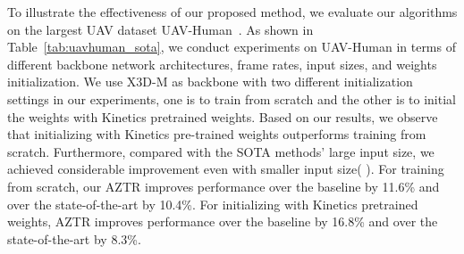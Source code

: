 \documentclass[letterpaper, 10 pt, conference]{ieeeconf}
\begin{document}
\begin{table}
\caption{Benchmarking UAV Human and comparisons with prior arts. We compared with the state-of-the-art methods, which demonstrates an improvement of  over SOTA methods. Trained on high-end desktop GPUs.}
\vspace{-5pt}
\label{tab:uavhuman_sota}
\end{table} To illustrate the effectiveness of our proposed method, we evaluate our algorithms on the largest UAV dataset UAV-Human~\cite{li2021uav}. As shown in Table~\ref{tab:uavhuman_sota}, we conduct experiments on UAV-Human in terms of different backbone network architectures, frame rates, input sizes, and weights initialization. We use X3D-M as backbone with two different initialization settings in our experiments, one is to train from scratch and the other is to initial the weights with Kinetics pretrained weights. Based on our results, we observe that initializing with Kinetics pre-trained weights outperforms training from scratch. Furthermore, compared with the SOTA methods' large input size, we achieved considerable improvement even with smaller input size( ). For training from scratch, our AZTR improves performance over the baseline by 11.6\% and over the state-of-the-art by 10.4\%. For initializing with Kinetics pretrained weights, AZTR improves performance over the baseline by 16.8\% and over the state-of-the-art by 8.3\%. 
\end{document}
